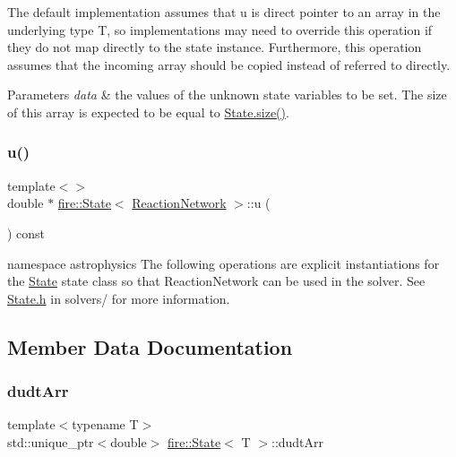 The default implementation assumes that u is direct pointer to an array in the underlying type T, so implementations may need to override this operation if they do not map directly to the state instance. Furthermore, this operation assumes that the incoming array should be copied instead of referred to directly.


\begin{DoxyParams}{Parameters}
{\em data} & the values of the unknown state variables to be set. The size of this array is expected to be equal to \hyperlink{a00818_a22b2d9e2feb153c819e90a4ac7ee8d72}{State.\+size()}. \\
\hline
\end{DoxyParams}
\mbox{\label{a00818_a9cc60054f9342b4a84b29937dc45a6d8}} 
\subsubsection{\texorpdfstring{u()}{u()}\hspace{0.1cm}{\footnotesize\ttfamily [3/3]}}
{\footnotesize\ttfamily template$<$$>$ \\
double $\ast$ \hyperlink{a00818}{fire\+::\+State}$<$ \hyperlink{a00738}{Reaction\+Network} $>$\+::u (\begin{DoxyParamCaption}{ }\end{DoxyParamCaption}) const}

namespace astrophysics The following operations are explicit instantiations for the \hyperlink{a00818}{State} state class so that Reaction\+Network can be used in the solver. See \hyperlink{a00095_source}{State.\+h} in solvers/ for more information. 

\subsection{Member Data Documentation}
\mbox{\label{a00818_a9954ba8c1a12555ca1bf67b6a2bf2b3b}} 
\subsubsection{\texorpdfstring{dudt\+Arr}{dudtArr}}
{\footnotesize\ttfamily template$<$typename T$>$ \\
std\+::unique\+\_\+ptr$<$double$>$ \hyperlink{a00818}{fire\+::\+State}$<$ T $>$\+::dudt\+Arr\hspace{0.3cm}{\ttfamily [protected]}}

